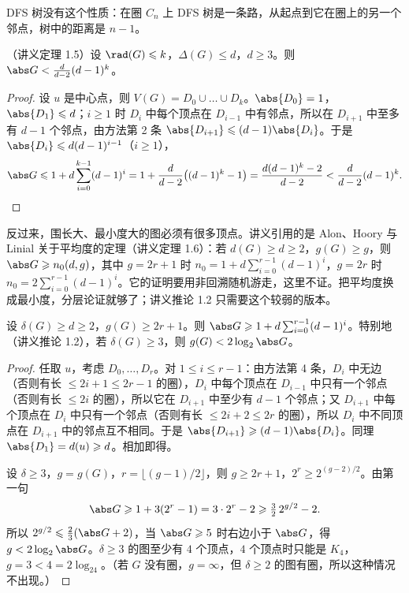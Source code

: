 DFS 树没有这个性质：在圈 $C_n$ 上 DFS 树是一条路，从起点到它在圈上的另一个邻点，树中的距离是 $n-1$。

\begin{theorem}\label{thm:distance-layers:moore}
（讲义定理 1.5）设 $\rad(G)\leqslant k$，$\Delta(G)\leqslant d$，$d\geqslant3$。则 $\abs G<\frac d{d-2}(d-1)^k$。
\end{theorem}
\begin{proof}
设 $u$ 是中心点，则 $V(G)=D_0\cup\dots\cup D_k$。$\abs{D_0}=1$，$\abs{D_1}\leqslant d$；$i\geqslant1$ 时 $D_i$ 中每个顶点在 $D_{i-1}$ 中有邻点，所以在 $D_{i+1}$ 中至多有 $d-1$ 个邻点，由方法第 2 条 $\abs{D_{i+1}}\leqslant(d-1)\abs{D_i}$。于是 $\abs{D_i}\leqslant d(d-1)^{i-1}$（$i\geqslant1$），
\[
\abs G\leqslant1+d\sum_{i=0}^{k-1}(d-1)^i=1+\frac d{d-2}\bigl((d-1)^k-1\bigr)=\frac{d(d-1)^k-2}{d-2}<\frac d{d-2}(d-1)^k. \qedhere
\]
\end{proof}

反过来，围长大、最小度大的图必须有很多顶点。讲义引用的是 Alon、Hoory 与 Linial 关于平均度的定理（讲义定理 1.6）：若 $d(G)\geqslant d\geqslant2$，$g(G)\geqslant g$，则 $\abs G\geqslant n_0(d,g)$，其中 $g=2r+1$ 时 $n_0=1+d\sum_{i=0}^{r-1}(d-1)^i$，$g=2r$ 时 $n_0=2\sum_{i=0}^{r-1}(d-1)^i$。它的证明要用非回溯随机游走，这里不证。把平均度换成最小度，分层论证就够了；讲义推论 1.2 只需要这个较弱的版本。

\begin{theorem}\label{thm:distance-layers:girth}
设 $\delta(G)\geqslant d\geqslant2$，$g(G)\geqslant2r+1$。则 $\abs G\geqslant1+d\sum_{i=0}^{r-1}(d-1)^i$。特别地（讲义推论 1.2），若 $\delta(G)\geqslant3$，则 $g(G)<2\log_2\abs G$。
\end{theorem}
\begin{proof}
任取 $u$，考虑 $D_0,\dots,D_r$。对 $1\leqslant i\leqslant r-1$：由方法第 4 条，$D_i$ 中无边（否则有长 $\leqslant2i+1\leqslant2r-1$ 的圈），$D_i$ 中每个顶点在 $D_{i-1}$ 中只有一个邻点（否则有长 $\leqslant2i$ 的圈），所以它在 $D_{i+1}$ 中至少有 $d-1$ 个邻点；又 $D_{i+1}$ 中每个顶点在 $D_i$ 中只有一个邻点（否则有长 $\leqslant2i+2\leqslant2r$ 的圈），所以 $D_i$ 中不同顶点在 $D_{i+1}$ 中的邻点互不相同。于是 $\abs{D_{i+1}}\geqslant(d-1)\abs{D_i}$。同理 $\abs{D_1}=d(u)\geqslant d$。相加即得。

设 $\delta\geqslant3$，$g=g(G)$，$r=\lfloor(g-1)/2\rfloor$，则 $g\geqslant2r+1$，$2^r\geqslant2^{(g-2)/2}$。由第一句
\[
\abs G\geqslant1+3(2^r-1)=3\cdot2^r-2\geqslant\tfrac32\,2^{g/2}-2 .
\]
所以 $2^{g/2}\leqslant\frac23(\abs G+2)$，当 $\abs G\geqslant5$ 时右边小于 $\abs G$，得 $g<2\log_2\abs G$。$\delta\geqslant3$ 的图至少有 $4$ 个顶点，$4$ 个顶点时只能是 $K_4$，$g=3<4=2\log_24$。（若 $G$ 没有圈，$g=\infty$，但 $\delta\geqslant2$ 的图有圈，所以这种情况不出现。）
\end{proof}


